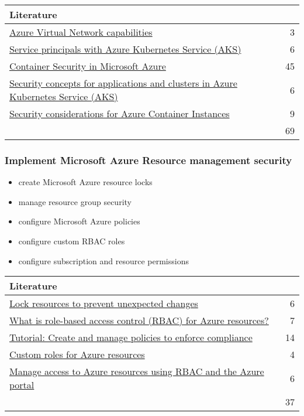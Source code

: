 \begin{tabular}{p{14cm} | r}
\textbf{Literature} & \\
\hline
\href{https://docs.microsoft.com/en-us/azure/virtual-network/container-networking-overview}{Azure Virtual Network capabilities} & 3 \\
\href{https://docs.microsoft.com/en-us/azure/aks/kubernetes-service-principal}{Service principals with Azure Kubernetes Service (AKS)} & 6 \\
\href{https://azure.microsoft.com/mediahandler/files/resourcefiles/container-security-in-microsoft-azure/Open\%20Container\%20Security\%20in\%20Microsoft\%20Azure.pdf}{Container Security in Microsoft Azure} & 45 \\
\href{https://docs.microsoft.com/en-us/azure/aks/concepts-security}{Security concepts for applications and clusters in Azure Kubernetes Service (AKS)} & 6 \\
\href{https://docs.microsoft.com/en-us/azure/container-instances/container-instances-image-security}{Security considerations for Azure Container Instances} & 9 \\
\cline{2-2} 
 & 69 \\
\end{tabular}

\subsubsection{Implement Microsoft Azure Resource management security}
\begin{itemize}
\item create Microsoft Azure resource locks 
\item manage resource group security 
\item configure Microsoft Azure policies 
\item configure custom RBAC roles 
\item configure subscription and resource permissions 
\end{itemize}

\begin{tabular}{p{14cm} | r}
\textbf{Literature} & \\
\hline
\href{https://docs.microsoft.com/en-us/azure/azure-resource-manager/resource-group-lock-resources}{Lock resources to prevent unexpected changes} & 6 \\
\href{https://docs.microsoft.com/en-us/azure/role-based-access-control/overview}{What is role-based access control (RBAC) for Azure resources?} & 7 \\
\href{https://docs.microsoft.com/en-us/azure/governance/policy/tutorials/create-and-manage}{Tutorial: Create and manage policies to enforce compliance} & 14 \\
\href{https://docs.microsoft.com/en-us/azure/role-based-access-control/custom-roles}{Custom roles for Azure resources} & 4 \\
\href{https://docs.microsoft.com/en-us/azure/role-based-access-control/role-assignments-portal}{Manage access to Azure resources using RBAC and the Azure portal} & 6 \\
\cline{2-2} 
 & 37 \\
\end{tabular}

